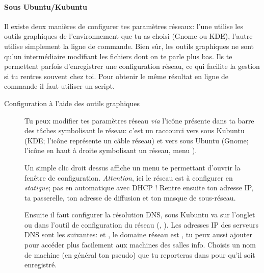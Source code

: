 \paragraph{Sous Ubuntu/Kubuntu}
\label{Ubuntu:IP}
Il existe deux manières de configurer tes paramètres réseaux: l'une utilise les outils graphiques de l'environnement que tu as choisi (Gnome ou KDE), 
l'autre utilise simplement la ligne de commande. Bien sûr, les outils graphiques ne sont qu'un intermédiaire modifiant les fichiers dont on te parle 
plus bas. Ils te permettent parfois d'enregistrer une configuration réseau, ce qui facilite la gestion si tu rentres souvent chez toi. Pour obtenir le 
même résultat en ligne de commande il faut utiliser un script.

\begin{description}
\item[Configuration à l'aide des outils graphiques]
Tu peux modifier tes paramètres réseau \emph{via} l'icône présente dans ta barre des tâches symbolisant le réseau: c'est un raccourci vers  sous Kubuntu (KDE; l'icône représente un c\^able réseau) et vers  sous Ubuntu (Gnome; l'icône en haut à droite symbolisant un réseau, menu ).

Un simple clic droit dessus affiche un menu te permettant d'ouvrir la fenêtre de configuration. \emph{Attention}, ici le réseau est à configurer en \emph{statique}; pas en automatique avec DHCP ! Rentre ensuite ton adresse IP, ta passerelle, ton adresse de diffusion et ton masque de sous-réseau.

Ensuite il faut configurer la résolution DNS, sous Kubuntu va sur l'onglet  ou dans l'outil de configuration du réseau
(, ). Les adresses IP des serveurs DNS sont les suivantes:  et , le domaine réseau
est , tu peux aussi ajouter  pour accéder plus facilement aux machines des salles info. Choisis un nom de machine
(en général ton pseudo) que tu reporteras dans  pour qu'il soit enregistré.




\end{description}
